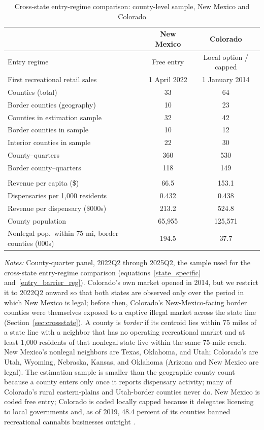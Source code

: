 \begin{table}[htbp]
\centering
\caption{Cross-state entry-regime comparison: county-level sample, New Mexico and Colorado}
\label{tab:sumstats_state}
\footnotesize
\begin{tabular}{lcc}
\toprule
 & New Mexico & Colorado \\
\midrule
Entry regime & Free entry & Local option / capped \\
First recreational retail sales & 1 April 2022 & 1 January 2014 \\
\addlinespace
Counties (total) & 33 & 64 \\
\quad Border counties (geography) & 10 & 23 \\
\addlinespace
Counties in estimation sample & 32 & 42 \\
\quad Border counties in sample & 10 & 12 \\
\quad Interior counties in sample & 22 & 30 \\
County--quarters & 360 & 530 \\
\quad Border county--quarters & 118 & 149 \\
\addlinespace
\multicolumn{3}{l}{\textit{County-quarter means}} \\
\quad Revenue per capita (\$) & 66.5 & 153.1 \\
\quad Dispensaries per 1,000 residents & 0.432 & 0.438 \\
\quad Revenue per dispensary (\$000s) & 213.2 & 524.8 \\
\quad County population & 65,955 & 125,571 \\
\quad Nonlegal pop.\ within 75 mi, border counties (000s) & 194.5 & 37.7 \\
\bottomrule
\end{tabular}
\begin{minipage}{0.86\textwidth}
\vspace{0.4em}\footnotesize
\textit{Notes:} County-quarter panel, 2022Q2 through 2025Q2, the sample used for the cross-state entry-regime comparison (equations~\ref{state_specific} and~\ref{entry_barrier_reg}). Colorado's own market opened in 2014, but we restrict it to 2022Q2 onward so that both states are observed only over the period in which New Mexico is legal; before then, Colorado's New-Mexico-facing border counties were themselves exposed to a captive illegal market across the state line (Section~\ref{sec:crossstate}). A county is \emph{border} if its centroid lies within 75 miles of a state line with a neighbor that has no operating recreational market and at least 1{,}000 residents of that nonlegal state live within the same 75-mile reach. New Mexico's nonlegal neighbors are Texas, Oklahoma, and Utah; Colorado's are Utah, Wyoming, Nebraska, Kansas, and Oklahoma (Arizona and New Mexico are legal). The estimation sample is smaller than the geographic county count because a county enters only once it reports dispensary activity; many of Colorado's rural eastern-plains and Utah-border counties never do. New Mexico is coded free entry; Colorado is coded locally capped because it delegates licensing to local governments and, as of 2019, 48.4 percent of its counties banned recreational cannabis businesses outright \citep{PayanBrownSong2021}.
\end{minipage}
\end{table}
